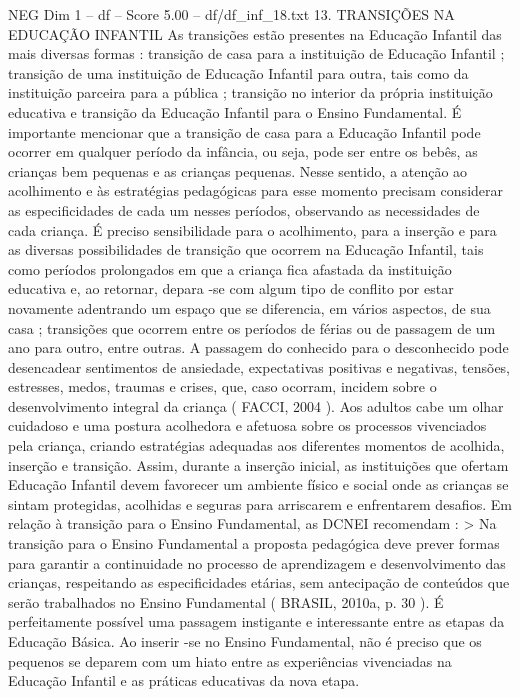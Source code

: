 \begin{textsample}{NEG Dim 1 – df – Score 5.00 – df/df\_inf\_18.txt}  \label{ex:f1_neg_167}
13.
TRANSIÇÕES NA EDUCAÇÃO INFANTIL As transições estão presentes na Educação Infantil das mais diversas formas : transição de casa para a instituição de Educação Infantil ; transição de uma instituição de Educação Infantil para outra, tais como da instituição parceira para a pública ; transição no interior da própria instituição educativa e transição da Educação Infantil para o Ensino Fundamental.
É importante mencionar que a transição de casa para a Educação Infantil pode ocorrer em qualquer período da infância, ou seja, pode ser entre os bebês, as crianças bem pequenas e as crianças pequenas.
Nesse sentido, a atenção ao acolhimento e às estratégias pedagógicas para esse momento precisam considerar as especificidades de cada um nesses períodos, observando as necessidades de cada criança.
É preciso sensibilidade para o acolhimento, para a inserção e para as diversas possibilidades de transição que ocorrem na Educação Infantil, tais como períodos prolongados em que a criança fica afastada da instituição educativa e, ao retornar, depara -se com algum tipo de conflito por estar novamente adentrando um espaço que se diferencia, em vários aspectos, de sua casa ; transições que ocorrem entre os períodos de férias ou de passagem de um ano para outro, entre outras.
A passagem do conhecido para o desconhecido pode desencadear sentimentos de ansiedade, expectativas positivas e negativas, tensões, estresses, medos, traumas e crises, que, caso ocorram, incidem sobre o desenvolvimento integral da criança ( FACCI, 2004 ).
Aos adultos cabe um olhar cuidadoso e uma postura acolhedora e afetuosa sobre os processos vivenciados pela criança, criando estratégias adequadas aos diferentes momentos de acolhida, inserção e transição.
Assim, durante a inserção inicial, as instituições que ofertam Educação Infantil devem favorecer um ambiente físico e social onde as crianças se sintam protegidas, acolhidas e seguras para arriscarem e enfrentarem desafios.
Em relação à transição para o Ensino Fundamental, as DCNEI recomendam : > Na transição para o Ensino Fundamental a proposta pedagógica deve prever formas para garantir a continuidade no processo de aprendizagem e desenvolvimento das crianças, respeitando as especificidades etárias, sem antecipação de conteúdos que serão trabalhados no Ensino Fundamental ( BRASIL, 2010a, p. 30 ).
É perfeitamente possível uma passagem instigante e interessante entre as etapas da Educação Básica.
Ao inserir -se no Ensino Fundamental, não é preciso que os pequenos se deparem com um hiato entre as experiências vivenciadas na Educação Infantil e as práticas educativas da nova etapa.

\end{textsample}
